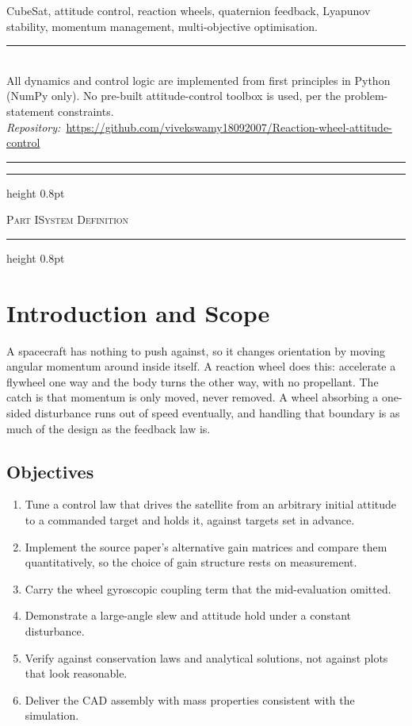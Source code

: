 \documentclass[conference,10pt,a4paper]{IEEEtran}
\newcommand{\reportpart}[2]{%
  \par\medskip\noindent
  \hrule height 0.8pt\vspace{3pt}
  \centerline{\footnotesize\scshape Part #1\quad\textbar\quad #2}
  \vspace{3pt}\hrule height 0.8pt
  \par\medskip}
\begin{document}
\begin{IEEEkeywords}
CubeSat, attitude control, reaction wheels, quaternion feedback, Lyapunov
stability, momentum management, multi-objective optimisation.
\end{IEEEkeywords}

\begin{center}
\rule{0.92\columnwidth}{0.4pt}\\[3pt]
{\footnotesize
All dynamics and control logic are implemented from first principles in Python
(NumPy only). No pre-built attitude-control toolbox is used, per the
problem-statement constraints.\\[3pt]
\textit{Repository:}\ \url{https://github.com/vivekswamy18092007/Reaction-wheel-attitude-control}}\\[3pt]
\rule{0.92\columnwidth}{0.4pt}
\end{center}

\vspace{4pt}
{\footnotesize\tableofcontents}
\vspace{4pt}

\reportpart{I}{System Definition}

\section{Introduction and Scope}
\label{sec:intro}

A spacecraft has nothing to push against, so it changes orientation by moving
angular momentum around inside itself. A reaction wheel does this: accelerate
a flywheel one way and the body turns the other way, with no propellant. The
catch is that momentum is only moved, never removed. A wheel absorbing a
one-sided disturbance runs out of speed eventually, and handling that boundary
is as much of the design as the feedback law is.

\subsection{Objectives}

\begin{enumerate}[label=\textbf{O\arabic*.},leftmargin=*,labelsep=0.5em]
\item Tune a control law that drives the satellite from an arbitrary initial
attitude to a commanded target and holds it, against targets set in advance.
\item Implement the source paper's alternative gain matrices and compare them
quantitatively, so the choice of gain structure rests on measurement.
\item Carry the wheel gyroscopic coupling term that the mid-evaluation omitted.
\item Demonstrate a large-angle slew and attitude hold under a constant
disturbance.
\item Verify against conservation laws and analytical solutions, not against
plots that look reasonable.
\item Deliver the CAD assembly with mass properties consistent with the
simulation.
\end{enumerate}
\end{document}
